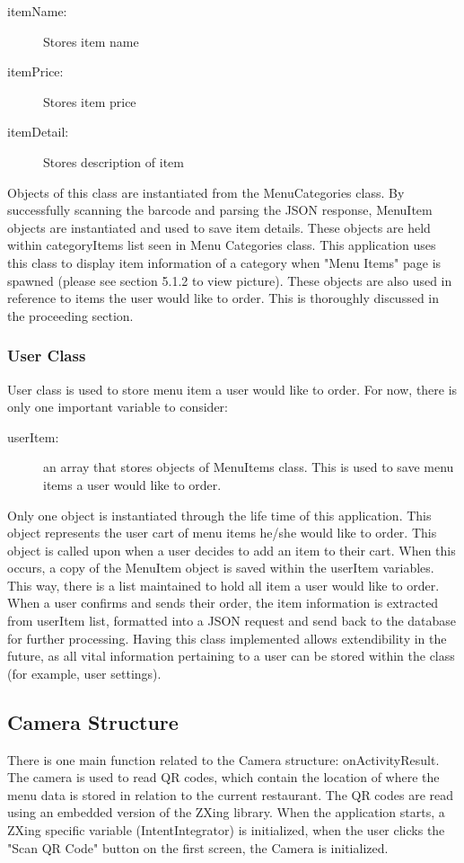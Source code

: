 \documentclass[12pt, titlepage]{article}
\begin{document}
\begin{description}
  \item[itemName:] Stores item name
  \item[itemPrice:] Stores item price
  \item[itemDetail:] Stores description of item
\end{description}

Objects of this class are instantiated from the MenuCategories class. By successfully scanning the barcode and parsing the JSON response, MenuItem objects are instantiated and used to save item details. These objects are held within categoryItems list seen in Menu Categories class. This application uses this class to display item information of a category when "Menu Items" page is spawned (please see section 5.1.2 to view picture). These objects are also used in reference to items the user would like to order. This is thoroughly discussed in the proceeding section.  

\subsubsection{User Class}
User class is used to store menu item a user would like to order. For now, there is only one important variable to consider: 

 \begin{description}
  \item[userItem:] an array that stores objects of MenuItems class. This is used to save menu items a user would like to order.
\end{description}

Only one object is instantiated through the life time of this application. This object represents the user cart of menu items he/she would like to order. This object is called upon when a user decides to add an item to their cart. When this occurs, a copy of the MenuItem object is saved within the userItem variables. This way, there is a list maintained to hold all item a user would like to order. When a user confirms and sends their order, the item information is extracted from userItem list, formatted into a JSON request and send back to the database for further processing. Having this class implemented allows extendibility in the future, as all vital information pertaining to a user can be stored within the class (for example, user settings).  


\subsection{Camera Structure}
There is one main function related to the Camera structure: onActivityResult. The camera is used to read QR codes, which contain the location of where the menu data is stored in relation to the current restaurant. The QR codes are read using an embedded version of the ZXing library. When the application starts, a ZXing specific variable (IntentIntegrator) is initialized, when the user clicks the "Scan QR Code" button on the first screen, the Camera is initialized. 
\end{document}
